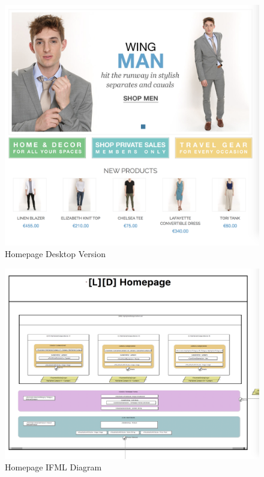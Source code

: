 \vspace{0.5cm}
\begin{figure}[H]
  \centering
    \includegraphics[width=14cm]{images/diagrams/before/desktop-homepage.png}
  \caption{Homepage Desktop Version}
  \label{fig:desktop-before-homepage}
\end{figure}
\vspace{0.5cm}

\begin{figure}[H]
  \centering
    \includegraphics[width=14cm]{images/diagrams/before/ifml-homepage.png}
  \caption{Homepage IFML Diagram}
  \label{fig:ifml-before-homepage}
\end{figure}
\vspace{0.5cm}

